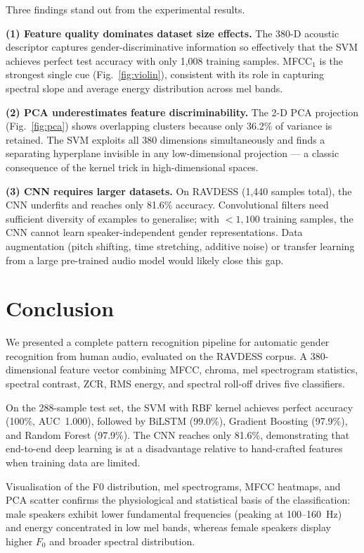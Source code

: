 \documentclass[conference]{IEEEtran}
\begin{document}
Three findings stand out from the experimental results.

\textbf{(1) Feature quality dominates dataset size effects.}
The 380-D acoustic descriptor captures gender-discriminative information
so effectively that the SVM achieves perfect test accuracy with only
1,008 training samples. MFCC$_1$ is the strongest single cue
(Fig.~\ref{fig:violin}), consistent with its role in capturing spectral
slope and average energy distribution across mel bands.

\textbf{(2) PCA underestimates feature discriminability.}
The 2-D PCA projection (Fig.~\ref{fig:pca}) shows overlapping clusters
because only 36.2\% of variance is retained. The SVM exploits all 380
dimensions simultaneously and finds a separating hyperplane invisible in
any low-dimensional projection --- a classic consequence of the
kernel trick in high-dimensional spaces.

\textbf{(3) CNN requires larger datasets.}
On RAVDESS (1,440 samples total), the CNN underfits and reaches only
81.6\% accuracy. Convolutional filters need sufficient diversity of
examples to generalise; with $<\!1{,}100$ training samples, the CNN
cannot learn speaker-independent gender representations.
Data augmentation (pitch shifting, time stretching, additive noise)
or transfer learning from a large pre-trained audio model would likely
close this gap.

\section{Conclusion}

We presented a complete pattern recognition pipeline for automatic gender
recognition from human audio, evaluated on the RAVDESS corpus.
A 380-dimensional feature vector combining MFCC, chroma, mel spectrogram
statistics, spectral contrast, ZCR, RMS energy, and spectral roll-off
drives five classifiers.

On the 288-sample test set, the SVM with RBF kernel achieves perfect
accuracy (100\%, AUC~1.000), followed by BiLSTM (99.0\%), Gradient
Boosting (97.9\%), and Random Forest (97.9\%).
The CNN reaches only 81.6\%, demonstrating that end-to-end deep learning
is at a disadvantage relative to hand-crafted features when training data
are limited.

Visualisation of the F0 distribution, mel spectrograms, MFCC heatmaps,
and PCA scatter confirms the physiological and statistical basis of the
classification: male speakers exhibit lower fundamental frequencies
(peaking at 100--160~Hz) and energy concentrated in low mel bands,
whereas female speakers display higher $F_0$ and broader spectral
distribution.
\end{document}
